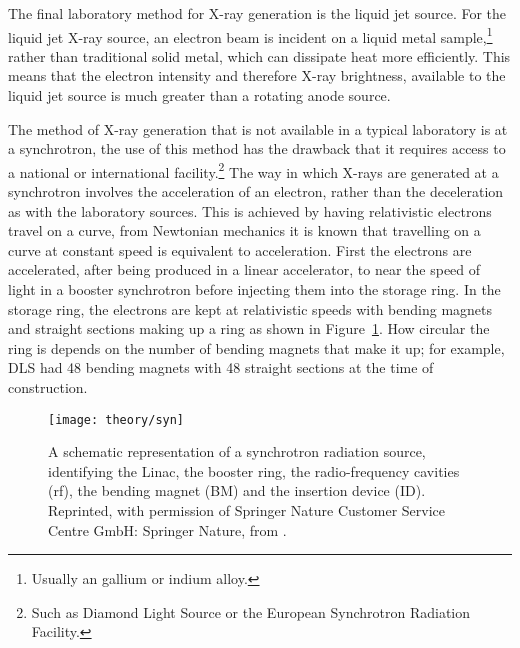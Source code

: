 The final laboratory method for X-ray generation is the liquid jet source.\autocite[][Branded MetalJet by excillum]{noauthor_metaljet_nodate}
For the liquid jet X-ray source, an electron beam is incident on a liquid metal sample,\footnote{Usually an gallium or indium alloy.} rather than traditional solid metal, which can dissipate heat more efficiently.
This means that the electron intensity and therefore X-ray brightness, available to the liquid jet source is much greater than a rotating anode source.

The method of X-ray generation that is not available in a typical laboratory is at a synchrotron, the use of this method has the drawback that it requires access to a national or international facility.\footnote{Such as Diamond Light Source or the European Synchrotron Radiation Facility.}
The way in which X-rays are generated at a synchrotron involves the acceleration of an electron, rather than the deceleration as with the laboratory sources.
This is achieved by having relativistic electrons travel on a curve, from Newtonian mechanics it is known that travelling on a curve at constant speed is equivalent to acceleration.
First the electrons are accelerated, after being produced in a linear accelerator, to near the speed of light in a booster synchrotron before injecting them into the storage ring.
In the storage ring, the electrons are kept at relativistic speeds with bending magnets and straight sections making up a ring as shown in Figure~\ref{fig:syn}.
How circular the ring is depends on the number of bending magnets that make it up; for example, DLS had \num{48} bending magnets with \num{48} straight sections at the time of construction.
%
\begin{figure}[t]
    \centering
    \texttt{[image: theory/syn]}
    \caption{A schematic representation of a synchrotron radiation source, identifying the Linac, the booster ring, the radio-frequency cavities (rf), the bending magnet (BM) and the insertion device (ID). Reprinted, with permission of Springer Nature Customer Service Centre GmbH: Springer Nature, from \cite{garcia-gutierrez_bases_2009}.}
    \label{fig:syn}
\end{figure}
%

